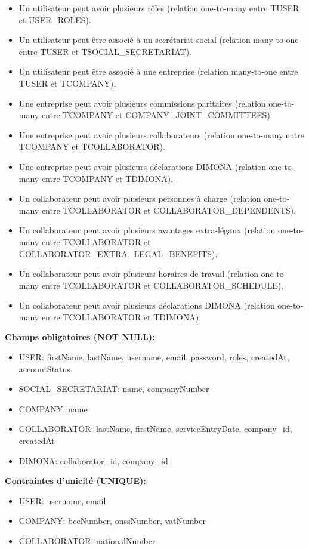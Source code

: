 \begin{itemize}
  \item Un utilisateur peut avoir plusieurs rôles (relation one-to-many entre TUSER et USER\_ROLES).
  \item Un utilisateur peut être associé à un secrétariat social (relation many-to-one entre TUSER et TSOCIAL\_SECRETARIAT).
  \item Un utilisateur peut être associé à une entreprise (relation many-to-one entre TUSER et TCOMPANY).
  \item Une entreprise peut avoir plusieurs commissions paritaires (relation one-to-many entre TCOMPANY et COMPANY\_JOINT\_COMMITTEES).
  \item Une entreprise peut avoir plusieurs collaborateurs (relation one-to-many entre TCOMPANY et TCOLLABORATOR).
  \item Une entreprise peut avoir plusieurs déclarations DIMONA (relation one-to-many entre TCOMPANY et TDIMONA).
  \item Un collaborateur peut avoir plusieurs personnes à charge (relation one-to-many entre TCOLLABORATOR et COLLABORATOR\_DEPENDENTS).
  \item Un collaborateur peut avoir plusieurs avantages extra-légaux (relation one-to-many entre TCOLLABORATOR et COLLABORATOR\_EXTRA\_LEGAL\_BENEFITS).
  \item Un collaborateur peut avoir plusieurs horaires de travail (relation one-to-many entre TCOLLABORATOR et COLLABORATOR\_SCHEDULE).
  \item Un collaborateur peut avoir plusieurs déclarations DIMONA (relation one-to-many entre TCOLLABORATOR et TDIMONA).
\end{itemize}

\textbf{Champs obligatoires (NOT NULL):}
\begin{itemize}
  \item USER: firstName, lastName, username, email, password, roles, createdAt, accountStatus
  \item SOCIAL\_SECRETARIAT: name, companyNumber
  \item COMPANY: name
  \item COLLABORATOR: lastName, firstName, serviceEntryDate, company\_id, createdAt
  \item DIMONA: collaborator\_id, company\_id
\end{itemize}

\textbf{Contraintes d'unicité (UNIQUE):}
\begin{itemize}
  \item USER: username, email
  \item COMPANY: bceNumber, onssNumber, vatNumber
  \item COLLABORATOR: nationalNumber
\end{itemize}

